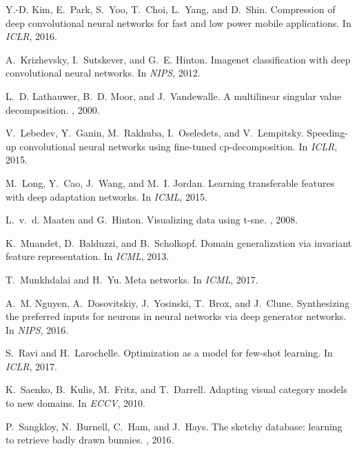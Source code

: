 \documentclass[10pt,twocolumn,letterpaper]{article}
\begin{document}
{\begin{thebibliography}{10}
Y.-D. Kim, E.~Park, S.~Yoo, T.~Choi, L.~Yang, and D.~Shin.
\newblock Compression of deep convolutional neural networks for fast and low
  power mobile applications.
\newblock In {\em ICLR}, 2016.

A.~Krizhevsky, I.~Sutskever, and G.~E. Hinton.
\newblock Imagenet classification with deep convolutional neural networks.
\newblock In {\em NIPS}, 2012.

L.~D. Lathauwer, B.~D. Moor, and J.~Vandewalle.
\newblock A multilinear singular value decomposition.
, 2000.

V.~Lebedev, Y.~Ganin, M.~Rakhuba, I.~Oseledets, and V.~Lempitsky.
\newblock Speeding-up convolutional neural networks using fine-tuned
  cp-decomposition.
\newblock In {\em ICLR}, 2015.

M.~Long, Y.~Cao, J.~Wang, and M.~I. Jordan.
\newblock Learning transferable features with deep adaptation networks.
\newblock In {\em ICML}, 2015.

L.~v.~d. Maaten and G.~Hinton.
\newblock Visualizing data using t-sne.
, 2008.

K.~Muandet, D.~Balduzzi, and B.~Scholkopf.
\newblock Domain generalization via invariant feature representation.
\newblock In {\em ICML}, 2013.

T.~Munkhdalai and H.~Yu.
\newblock Meta networks.
\newblock In {\em ICML}, 2017.

A.~M. Nguyen, A.~Dosovitskiy, J.~Yosinski, T.~Brox, and J.~Clune.
\newblock Synthesizing the preferred inputs for neurons in neural networks via
  deep generator networks.
\newblock In {\em NIPS}, 2016.

S.~Ravi and H.~Larochelle.
\newblock Optimization as a model for few-shot learning.
\newblock In {\em ICLR}, 2017.

K.~Saenko, B.~Kulis, M.~Fritz, and T.~Darrell.
\newblock Adapting visual category models to new domains.
\newblock In {\em ECCV}, 2010.

P.~Sangkloy, N.~Burnell, C.~Ham, and J.~Hays.
\newblock The sketchy database: learning to retrieve badly drawn bunnies.
, 2016.


\end{thebibliography}}
\end{document}
